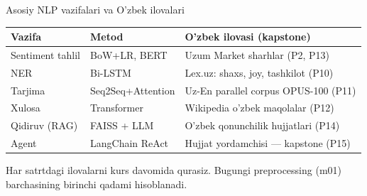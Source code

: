 \documentclass[aspectratio=169,11pt]{beamer}
\begin{document}
\begin{frame}{Asosiy NLP vazifalari va O'zbek ilovalari}
  \small
  \begin{tabular}{p{2.5cm}p{2.8cm}p{5.5cm}}
    \toprule
    \textbf{Vazifa} & \textbf{Metod} & \textbf{O'zbek ilovasi (kapstone) } \\
    \midrule
    Sentiment tahlil & BoW+LR, BERT & Uzum Market sharhlar (P2, P13) \\
    NER & Bi-LSTM & Lex.uz: shaxs, joy, tashkilot (P10) \\
    Tarjima & Seq2Seq+Attention & Uz-En parallel corpus OPUS-100 (P11) \\
    Xulosa & Transformer & Wikipedia o'zbek maqolalar (P12) \\
    Qidiruv (RAG) & FAISS + LLM & O'zbek qonunchilik hujjatlari (P14) \\
    Agent & LangChain ReAct & Hujjat yordamchisi --- kapstone (P15) \\
    \bottomrule
  \end{tabular}
  \vspace{5pt}
  \begin{tcolorbox}[okbox,title=Siz quradigan loyihalarga aloqasi,top=2pt,bottom=2pt]
    \footnotesize
    Har satrtdagi ilovalarni kurs davomida qurasiz. Bugungi preprocessing (m01) barchasining
    birinchi qadami hisoblanadi.
  \end{tcolorbox}
\end{frame}

\end{document}
